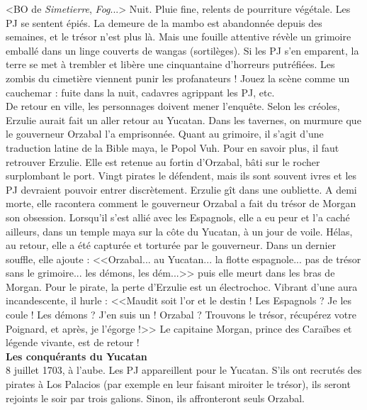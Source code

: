 \documentclass[11pt,twoside,a4paper]{book}
\begin{document}
<BO de \emph{Simetierre}, \emph{Fog}...> Nuit. Pluie fine, relents de pourriture v{\'e}g{\'e}tale. Les PJ se sentent {\'e}pi{\'e}s. La demeure de la mambo est abandonn{\'e}e depuis des semaines, et le tr{\'e}sor n'est plus l{\`a}. Mais une fouille attentive r{\'e}v{\`e}le un grimoire emball{\'e} dans un linge couverts de wangas (sortil{\`e}ges). Si les PJ s'en emparent, la terre se met {\`a} trembler et lib{\`e}re une cinquantaine d'horreurs putr{\'e}fi{\'e}es. Les zombis du cimeti{\`e}re viennent punir les profanateurs ! Jouez la sc{\`e}ne comme un cauchemar : fuite dans la nuit, cadavres agrippant les PJ, etc.~\\

De retour en ville, les personnages doivent mener l'enqu{\^e}te. Selon les cr{\'e}oles, Erzulie aurait fait un aller retour au Yucatan. Dans les tavernes, on murmure que le gouverneur Orzabal l'a emprisonn{\'e}e. Quant au grimoire, il s'agit d'une traduction latine de la Bible maya, le Popol Vuh. Pour en savoir plus, il faut retrouver Erzulie. Elle est retenue au fortin d'Orzabal, b{\^a}ti sur le rocher surplombant le port. Vingt pirates le d{\'e}fendent, mais ils sont souvent ivres et les PJ devraient pouvoir entrer discr{\`e}tement. Erzulie g{\^i}t dans une oubliette. A demi morte, elle racontera comment le gouverneur Orzabal a fait du tr{\'e}sor de Morgan son obsession. Lorsqu'il s'est alli{\'e} avec les Espagnols, elle a eu peur et l'a cach{\'e} ailleurs, dans un temple maya sur la c{\^o}te du Yucatan, {\`a} un jour de voile. H{\'e}las, au retour, elle a {\'e}t{\'e} captur{\'e}e et tortur{\'e}e par le gouverneur. Dans un dernier souffle, elle ajoute : <<Orzabal... au Yucatan... la flotte espagnole... pas de tr{\'e}sor sans le grimoire... les d{\'e}mons, les d{\'e}m...>> puis elle meurt dans les bras de Morgan. Pour le pirate, la perte d'Erzulie est un {\'e}lectrochoc. Vibrant d'une aura incandescente, il hurle : <<Maudit soit l'or et le destin ! Les Espagnols ? Je les coule ! Les d{\'e}mons ? J'en suis un ! Orzabal ? Trouvons le tr{\'e}sor, r{\'e}cup{\'e}rez votre Poignard, et apr{\`e}s, je l'{\'e}gorge !>> Le capitaine Morgan, prince des Cara{\"i}bes et l{\'e}gende vivante, est de retour !~\\

\textbf{\large Les conqu{\'e}rants du Yucatan}~\\

8 juillet 1703, {\`a} l'aube. Les PJ appareillent pour le Yucatan. S'ils ont recrut{\'e}s des pirates {\`a} Los Palacios (par exemple en leur faisant miroiter le tr{\'e}sor), ils seront rejoints le soir par trois galions. Sinon, ils affronteront seuls Orzabal.~\\
\end{document}
